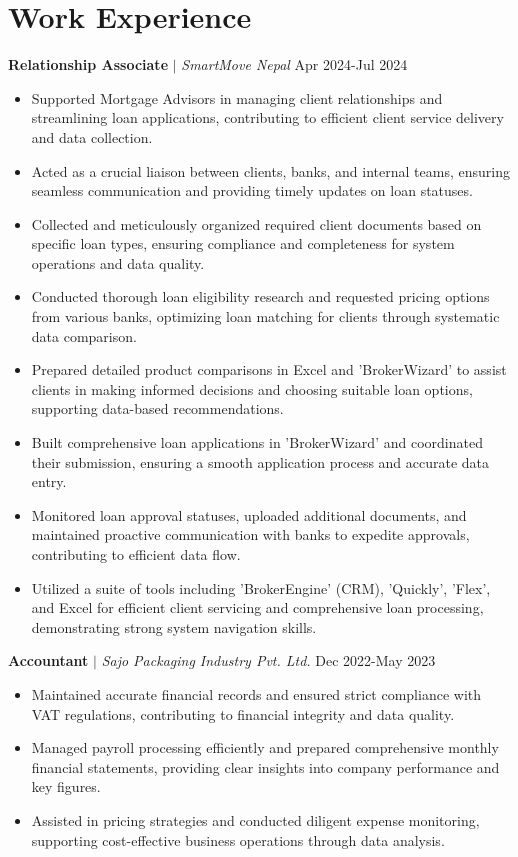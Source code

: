 \documentclass[10pt, letterpaper]{article}
\begin{document}
\section{Work Experience}
\noindent\textbf{Relationship Associate} $|$ \textit{SmartMove Nepal} \hfill Apr 2024-Jul 2024\\
\begin{itemize}[leftmargin=0.15in, topsep=0pt, partopsep=0pt, itemsep=-2pt]
    \item Supported Mortgage Advisors in managing client relationships and streamlining loan applications, contributing to efficient client service delivery and data collection.
    \item Acted as a crucial liaison between clients, banks, and internal teams, ensuring seamless communication and providing timely updates on loan statuses.
    \item Collected and meticulously organized required client documents based on specific loan types, ensuring compliance and completeness for system operations and data quality.
    \item Conducted thorough loan eligibility research and requested pricing options from various banks, optimizing loan matching for clients through systematic data comparison.
    \item Prepared detailed product comparisons in Excel and 'BrokerWizard' to assist clients in making informed decisions and choosing suitable loan options, supporting data-based recommendations.
    \item Built comprehensive loan applications in 'BrokerWizard' and coordinated their submission, ensuring a smooth application process and accurate data entry.
    \item Monitored loan approval statuses, uploaded additional documents, and maintained proactive communication with banks to expedite approvals, contributing to efficient data flow.
    \item Utilized a suite of tools including 'BrokerEngine' (CRM), 'Quickly', 'Flex', and Excel for efficient client servicing and comprehensive loan processing, demonstrating strong system navigation skills.
\end{itemize}
\vspace{4pt}
\noindent\textbf{Accountant} $|$ \textit{Sajo Packaging Industry Pvt. Ltd.} \hfill Dec 2022-May 2023\\
\begin{itemize}[leftmargin=0.15in, topsep=0pt, partopsep=0pt, itemsep=-2pt]
    \item Maintained accurate financial records and ensured strict compliance with VAT regulations, contributing to financial integrity and data quality.
    \item Managed payroll processing efficiently and prepared comprehensive monthly financial statements, providing clear insights into company performance and key figures.
    \item Assisted in pricing strategies and conducted diligent expense monitoring, supporting cost-effective business operations through data analysis.
\end{itemize}
\end{document}

